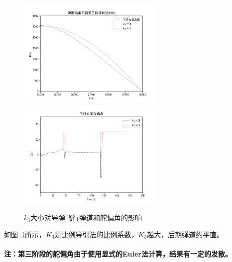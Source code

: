 \documentclass[UTF8]{ctexart}
\begin{document}
\begin{figure}[H]
    \centering
    \includegraphics[width=70mm]{../img/飞行轨迹4.png}
    \includegraphics[width=70mm]{../img/飞行舵偏角4.png}
    \caption{$k_3$大小对导弹飞行弹道和舵偏角的影响}\label{fig:k3}
\end{figure}
如图~\ref{fig:k3}所示，$K_{3}$是比例导引法的比例系数，$K_3$越大，后期弹道约平直。
~\\
~\\

\bf 注：第三阶段的舵偏角由于使用显式的Euler法计算，结果有一定的发散。
\clearpage




\clearpage

\end{document}
